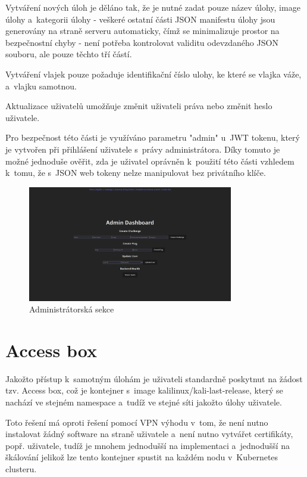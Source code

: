 \documentclass[12pt, a4paper,
oneside,      %
openright
]{report}
\begin{document}
Vytváření nových úloh je děláno tak, že je nutné zadat pouze název úlohy, image úlohy a~kategorii úlohy - veškeré ostatní části JSON manifestu úlohy jsou generovány na straně serveru automaticky, čímž se minimalizuje prostor na bezpečnostní chyby - není potřeba kontrolovat validitu odevzdaného JSON souboru, ale pouze těchto tří částí. 

Vytváření vlajek pouze požaduje identifikační číslo ulohy, ke které se vlajka váže, a~vlajku samotnou.

Aktualizace uživatelů umožňuje změnit uživateli práva nebo změnit heslo uživatele.

Pro bezpečnost této části je využíváno parametru "admin" u~JWT tokenu, který je vytvořen při přihlášení uživatele s~právy administrátora. Díky tomuto je možné jednoduše ověřit, zda je uživatel oprávněn k~použití této části vzhledem k~tomu, že s~JSON web tokeny nelze manipulovat bez privátního klíče.

\begin{figure}[h]
	\centering
	\includegraphics[width=0.8\textwidth]{07-admin.png}
	\caption{Administrátorská sekce}
	\label{fig:frontend-admin}
\end{figure}

\section{Access box}
Jakožto přístup k~samotným úlohám je uživateli standardně poskytnut na žádost tzv. Access box, což je kontejner s~image kalilinux/kali-last-release, který se nachází ve stejném namespace a~tudíž ve stejné síti jakožto úlohy uživatele. 

Toto řešení má oproti řešení pomocí VPN výhodu v~tom, že není nutno instalovat žádný software na straně uživatele a~není nutno vytvářet certifikáty, popř. uživatele, tudíž je mnohem jednodušší na implementaci a~jednodušší na škálování jelikož lze tento kontejner spustit na každém nodu v~Kubernetes clusteru.
\end{document}
